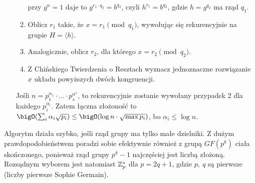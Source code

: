\begin{greyframe}
\begin{enumerate}[I]
\begin{enumerate}
\[            \]
            przy \( g^n = 1 \) daje to \( g^{r_1 \cdot q_2} = b^{q_2} \), czyli \( h^{r_1} = b^{q_2} \), gdzie \( h = g^{q_2} \) ma rząd \( q_1 \).
            \item Oblicz \( r_1 \) takie, że \( x = r_1 \pmod{q_1} \), wywołując się rekurencyjnie na grupie \( H = \langle h \rangle \).
            \item Analogicznie, oblicz \( r_2 \), dla którego \( x = r_2 \pmod{q_2} \).
            \item Z Chińskiego Twierdzenia o Resztach wyznacz jednoznaczne rozwiązanie \( x \) układu powyższych dwóch kongruencji.
        \end{enumerate}
        Jeśli \( n = p_1^{\alpha_1} \cdot \ldots \cdot p_s^{\alpha^s} \), to rekurencyjnie zostanie wywołany przypadek 2 dla każdego \( p_i^{\alpha_i} \).
        Zatem łączna złożoność to \( \bigO(\sum_i \alpha_i \sqrt{p_i}) \leq \bigO(\log n \cdot \sqrt{\max{p_i}}) \), bo \( \alpha_i \leq \log n \).
    \end{enumerate}
\end{greyframe}
Algorytm działa szybko, jeśli rząd grupy ma tylko małe dzielniki. Z dużym prawdopodobieństwem poradzi sobie efektywnie również z grupą \( GF(p^k) \) ciała skończonego, ponieważ rząd grupy \( p^k - 1 \) najczęściej jest liczbą złożoną.
Rozsądnym wyborem jest natomiast \( \mathbb{Z}^{*}_p \) dla \( p = 2q + 1 \), gdzie \( p, \ q \) są pierwsze (liczby pierwsze Sophie Germain).